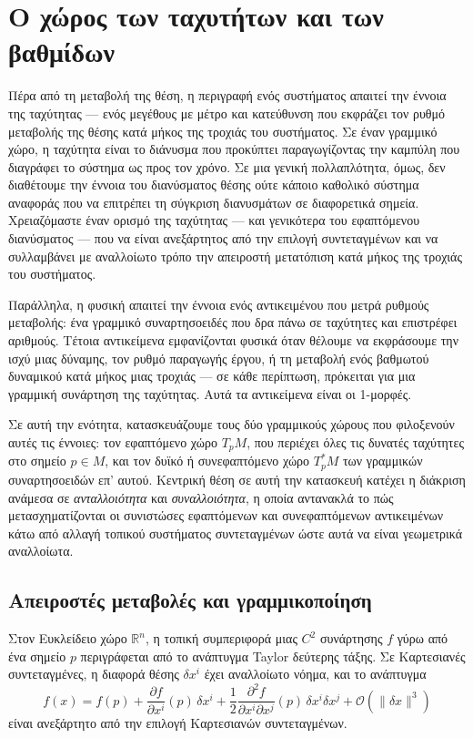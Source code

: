\documentclass[11pt,a4paper,twoside,openright]{book}
\begin{document}
\section{Ο χώρος των ταχυτήτων και των βαθμίδων}

Πέρα από τη μεταβολή της θέση, η περιγραφή ενός συστήματος απαιτεί την έννοια της ταχύτητας --- ενός μεγέθους με μέτρο και κατεύθυνση που εκφράζει τον ρυθμό μεταβολής της θέσης κατά μήκος της τροχιάς του συστήματος. Σε έναν γραμμικό χώρο, η ταχύτητα είναι το διάνυσμα που προκύπτει παραγωγίζοντας την καμπύλη που διαγράφει το σύστημα ως προς τον χρόνο. Σε μια γενική πολλαπλότητα, όμως, δεν διαθέτουμε την έννοια του διανύσματος θέσης ούτε κάποιο καθολικό σύστημα αναφοράς που να επιτρέπει τη σύγκριση διανυσμάτων σε διαφορετικά σημεία. Χρειαζόμαστε έναν ορισμό της ταχύτητας --- και γενικότερα του εφαπτόμενου διανύσματος --- που να είναι ανεξάρτητος από την επιλογή συντεταγμένων και να συλλαμβάνει με αναλλοίωτο τρόπο την απειροστή μετατόπιση κατά μήκος της τροχιάς του συστήματος.

Παράλληλα, η φυσική απαιτεί την έννοια ενός αντικειμένου που μετρά ρυθμούς μεταβολής: ένα γραμμικό συναρτησοειδές που δρα πάνω σε ταχύτητες και επιστρέφει αριθμούς. Τέτοια αντικείμενα εμφανίζονται φυσικά όταν θέλουμε να εκφράσουμε την ισχύ μιας δύναμης, τον ρυθμό παραγωγής έργου, ή τη μεταβολή ενός βαθμωτού δυναμικού κατά μήκος μιας τροχιάς --- σε κάθε περίπτωση, πρόκειται για μια γραμμική συνάρτηση της ταχύτητας. Αυτά τα αντικείμενα είναι οι 1-μορφές.

Σε αυτή την ενότητα, κατασκευάζουμε τους δύο γραμμικούς χώρους που φιλοξενούν αυτές τις έννοιες: τον εφαπτόμενο χώρο $T_pM$, που περιέχει όλες τις δυνατές ταχύτητες στο σημείο $p \in M$, και τον δυϊκό ή συνεφαπτόμενο χώρο $T_p^*M$ των γραμμικών συναρτησοειδών επ' αυτού. Κεντρική θέση σε αυτή την κατασκευή κατέχει η διάκριση ανάμεσα σε \textit{ανταλλοιότητα} και \textit{συναλλοιότητα},
η οποία αντανακλά το πώς μετασχηματίζονται οι συνιστώσες εφαπτόμενων και συνεφαπτόμενων αντικειμένων κάτω από αλλαγή
τοπικού συστήματος συντεταγμένων ώστε αυτά να είναι γεωμετρικά αναλλοίωτα.

\subsection{Απειροστές μεταβολές και γραμμικοποίηση}
	\label{sec:linearization}

Στον Ευκλείδειο χώρο $\mathbb{R}^n$, η τοπική συμπεριφορά μιας $C^2$ συνάρτησης $f$ γύρω από ένα σημείο $p$ περιγράφεται από το ανάπτυγμα Taylor δεύτερης τάξης. Σε Καρτεσιανές συντεταγμένες, η διαφορά θέσης $\delta x^i$ έχει αναλλοίωτο νόημα, και το ανάπτυγμα
\begin{equation}
f(x) = f(p) + \frac{\partial f}{\partial x^i}(p) \, \delta x^i + \frac{1}{2} \frac{\partial^2 f}{\partial x^i \partial x^j}(p) \, \delta x^i \delta x^j + \mathcal{O}(\|\delta x\|^3)
\end{equation}
είναι ανεξάρτητο από την επιλογή Καρτεσιανών συντεταγμένων.
\end{document}

